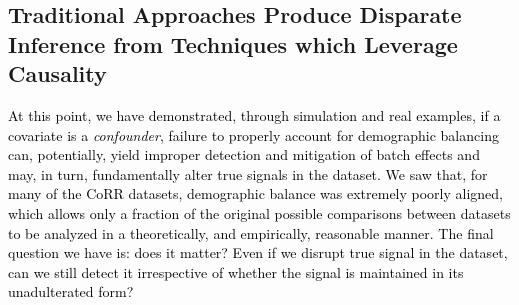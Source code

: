 \label{sec:study_est_adjustment}

\subsection{Traditional Approaches Produce Disparate Inference from Techniques which Leverage Causality}
\textcolor{black}{At this point, we have demonstrated, through simulation and real examples, if a covariate is a \textit{confounder}, failure to properly account for demographic balancing can, potentially, yield improper detection and mitigation of batch effects and may, in turn, fundamentally alter true signals in the dataset. We saw that, for many of the CoRR \cite{corr} datasets, demographic balance was extremely poorly aligned, which allows only a fraction of the original possible comparisons between datasets to be analyzed in a theoretically, and empirically, reasonable manner. The final question we have is: does it matter? Even if we disrupt true signal in the dataset, can we still detect it irrespective of whether the signal is maintained in its unadulterated form?}

